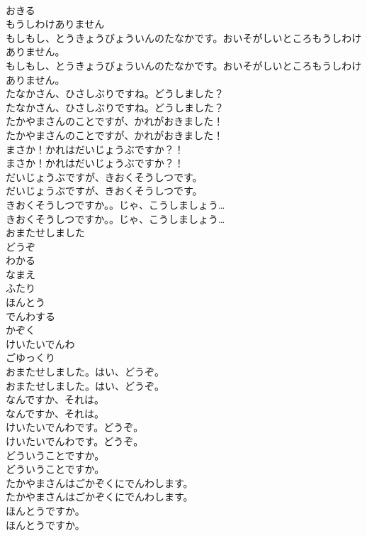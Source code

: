 \documentclass[8pt]{extreport}
\begin{document}
\begin{CJK}{UTF8}{min}
\\	おきる
\\	もうしわけありません
\\	もしもし、とうきょうびょういんのたなかです。おいそがしいところもうしわけありません。	
\\	もしもし、とうきょうびょういんのたなかです。おいそがしいところもうしわけありません。 
\\	たなかさん、ひさしぶりですね。どうしました？	
\\	たなかさん、ひさしぶりですね。どうしました？ 
\\	たかやまさんのことですが、かれがおきました！	
\\	たかやまさんのことですが、かれがおきました！ 
\\	まさか！かれはだいじょうぶですか？！	
\\	まさか！かれはだいじょうぶですか？！ 
\\	だいじょうぶですが、きおくそうしつです。	
\\	だいじょうぶですが、きおくそうしつです。 
\\	きおくそうしつですか。。じゃ、こうしましょう…	
\\	きおくそうしつですか。。じゃ、こうしましょう… 
\\	おまたせしました
\\	どうぞ
\\	わかる
\\	なまえ
\\	ふたり
\\	ほんとう
\\	でんわする
\\	かぞく
\\	けいたいでんわ
\\	ごゆっくり
\\	おまたせしました。はい、どうぞ。	
\\	おまたせしました。はい、どうぞ。 
\\	なんですか、それは。	
\\	なんですか、それは。 
\\	けいたいでんわです。どうぞ。	
\\	けいたいでんわです。どうぞ。 
\\	どういうことですか。	
\\	どういうことですか。 
\\	たかやまさんはごかぞくにでんわします。	
\\	たかやまさんはごかぞくにでんわします。 
\\	ほんとうですか。	
\\	ほんとうですか。 

\end{CJK}
\end{document}
